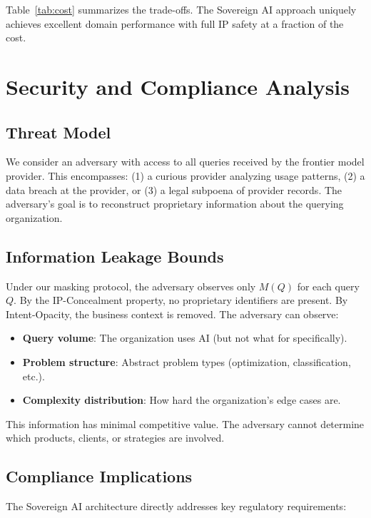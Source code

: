 \documentclass[11pt,a4paper]{article}
\begin{document}
Table~\ref{tab:cost} summarizes the trade-offs. The Sovereign AI approach uniquely achieves excellent domain performance with full IP safety at a fraction of the cost.

\section{Security and Compliance Analysis}
\label{sec:security}

\subsection{Threat Model}

We consider an adversary with access to all queries received by the frontier model provider. This encompasses: (1) a curious provider analyzing usage patterns, (2) a data breach at the provider, or (3) a legal subpoena of provider records. The adversary's goal is to reconstruct proprietary information about the querying organization.

\subsection{Information Leakage Bounds}

Under our masking protocol, the adversary observes only $M(Q)$ for each query $Q$. By the IP-Concealment property, no proprietary identifiers are present. By Intent-Opacity, the business context is removed. The adversary can observe:

\begin{itemize}[leftmargin=2em]
    \item \textbf{Query volume}: The organization uses AI (but not what for specifically).
    \item \textbf{Problem structure}: Abstract problem types (optimization, classification, etc.).
    \item \textbf{Complexity distribution}: How hard the organization's edge cases are.
\end{itemize}

This information has minimal competitive value. The adversary cannot determine which products, clients, or strategies are involved.

\subsection{Compliance Implications}

The Sovereign AI architecture directly addresses key regulatory requirements:
\end{document}
